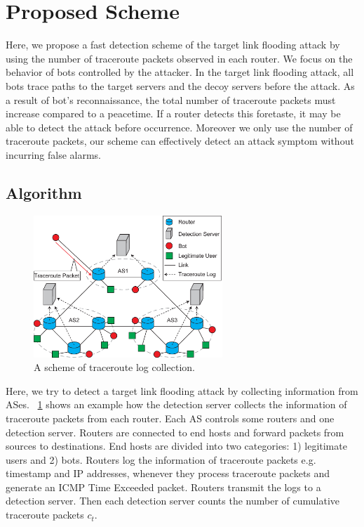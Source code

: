 \documentclass[conference]{IEEEtran}
\begin{document}
  \section{Proposed Scheme}\label{Sec:Proposed Scheme}
    Here, we propose a fast detection scheme of the target link flooding attack by using the number of traceroute packets observed in each router.
    We focus on the behavior of bots controlled by the attacker.
    In the target link flooding attack, all bots trace paths to the target servers and the decoy servers before the attack.
    As a result of bot's reconnaissance, the total number of traceroute packets must increase compared to a peacetime.
    If a router detects this foretaste, it may be able to detect the attack before occurrence.
    Moreover we only use the number of traceroute packets, our scheme can effectively detect an attack symptom without incurring false alarms.

  \subsection{Algorithm}\label{Sec:Algorithm}
    \begin{figure}[!t]
      \centering
      \includegraphics[clip, width=2.8in]{./image/ProposedScheme_a.eps}
      \caption{A scheme of traceroute log collection.}
      \label{A scheme of traceroute log collection}
    \end{figure}
    Here, we try to detect a target link flooding attack by collecting information from ASes.
    \figurename~\ref{A scheme of traceroute log collection} shows an example how the detection server collects the information of traceroute packets from each router.
    Each AS controls some routers and one detection server.
    Routers are connected to end hosts and forward packets from sources to destinations.
    End hosts are divided into two categories: 1) legitimate users and 2) bots.
    Routers log the information of traceroute packets e.g. timestamp and IP addresses, whenever they process traceroute packets and generate an ICMP Time Exceeded packet.
    Routers transmit the logs to a detection server.
    Then each detection server counts the number of cumulative traceroute packets $c_{t}$.
\end{document}
